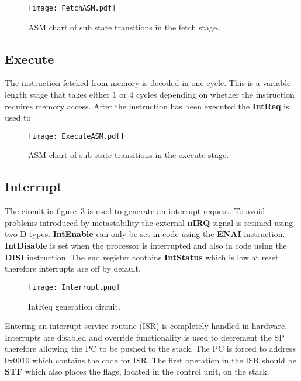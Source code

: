 \begin{figure}[ht]
   \centering
    \texttt{[image: FetchASM.pdf]}
		\caption{ASM chart of sub state transitions in the fetch stage.}
		\label{fig:FetchASM}
\end{figure}





\subsection{Execute}

The instruction fetched from memory is decoded in one cycle.
This is a variable length stage that takes either $1$ or $4$ cycles depending on whether the instruction requires memory access.
After the instruction has been executed the \textbf{IntReq} is used to 

\begin{figure}[ht]
   \centering
    \texttt{[image: ExecuteASM.pdf]}
		\caption{ASM chart of sub state transitions in the execute stage.}
		\label{fig:ExecuteASM}
\end{figure}





\subsection{Interrupt}

The circuit in figure~\ref{fig:IntReqCircuit} is used to generate an interrupt request.
To avoid problems introduced by metastability the external \textbf{nIRQ} signal is retimed using two D-types.
\textbf{IntEnable} can only be set in code using the \textbf{ENAI} instruction.
\textbf{IntDisable} is set when the processor is interrupted and also in code using the \textbf{DISI} instruction.
The end register contains \textbf{IntStatus} which is low at reset therefore interrupts are off by default. 

\begin{figure}[ht]
   \centering
    \texttt{[image: Interrupt.png]}
		\caption{IntReq generation circuit.}
		\label{fig:IntReqCircuit}
\end{figure}


Entering an interrupt service routine (ISR) is completely handled in hardware. 
Interrupts are disabled and override functionality is used to decrement the SP therefore allowing the PC to be pushed to the stack.
The PC is forced to address $0$x$0010$ which contains the code for ISR. 
The first operation in the ISR should be \textbf{STF} which also places the flags, located in the control unit, on the stack.

